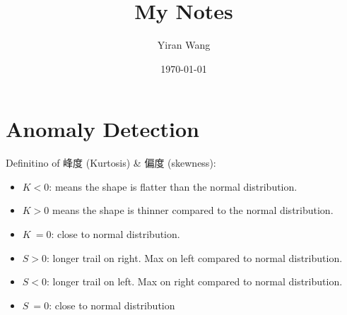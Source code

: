 \documentclass{article}   %
\title{My Notes}
\author{Yiran Wang}
\date{\today}
\begin{document}
\maketitle

\section{Anomaly Detection}
Definitino of 峰度 (Kurtosis) \& 偏度 (skewness):
\begin{itemize}
    \item $K < 0$: means the shape is flatter than the normal distribution.
    \item $K > 0$ means the shape is thinner compared to the normal distribution.
    \item $K ~= 0$: close to normal distribution.
   
    \item $S > 0$: longer trail on right. Max on left compared to normal distribution.
    \item $S < 0$: longer trail on left. Max on right compared to normal distribution.
    \item $S ~= 0$:  close to normal distribution
    
\end{itemize}
\end{document}
